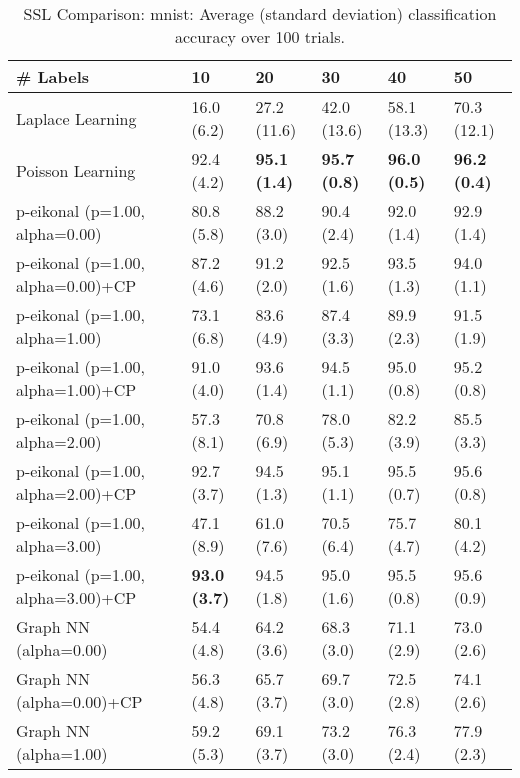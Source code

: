 \documentclass{article}
\begin{document}
\begin{table*}[t!]
\vspace{-3mm}
\caption{SSL Comparison: mnist: Average (standard deviation) classification accuracy over 100 trials.}
\vspace{-3mm}
\label{tab:SSL Comparison: mnist}
\vskip 0.15in
\begin{center}
\begin{small}
\begin{sc}
\begin{tabular}{llllll}
\toprule
\# Labels&\textbf{10}&\textbf{20}&\textbf{30}&\textbf{40}&\textbf{50}\\
\midrule
Laplace Learning&16.0 (6.2)      &27.2 (11.6)      &42.0 (13.6)      &58.1 (13.3)      &70.3 (12.1)      \\
Poisson Learning&92.4 (4.2)      &{\bf 95.1 (1.4)}&{\bf 95.7 (0.8)}&{\bf 96.0 (0.5)}&{\bf 96.2 (0.4)}\\
p-eikonal (p=1.00, alpha=0.00)&80.8 (5.8)      &88.2 (3.0)      &90.4 (2.4)      &92.0 (1.4)      &92.9 (1.4)      \\
p-eikonal (p=1.00, alpha=0.00)+CP&87.2 (4.6)      &91.2 (2.0)      &92.5 (1.6)      &93.5 (1.3)      &94.0 (1.1)      \\
p-eikonal (p=1.00, alpha=1.00)&73.1 (6.8)      &83.6 (4.9)      &87.4 (3.3)      &89.9 (2.3)      &91.5 (1.9)      \\
p-eikonal (p=1.00, alpha=1.00)+CP&91.0 (4.0)      &93.6 (1.4)      &94.5 (1.1)      &95.0 (0.8)      &95.2 (0.8)      \\
p-eikonal (p=1.00, alpha=2.00)&57.3 (8.1)      &70.8 (6.9)      &78.0 (5.3)      &82.2 (3.9)      &85.5 (3.3)      \\
p-eikonal (p=1.00, alpha=2.00)+CP&92.7 (3.7)      &94.5 (1.3)      &95.1 (1.1)      &95.5 (0.7)      &95.6 (0.8)      \\
p-eikonal (p=1.00, alpha=3.00)&47.1 (8.9)      &61.0 (7.6)      &70.5 (6.4)      &75.7 (4.7)      &80.1 (4.2)      \\
p-eikonal (p=1.00, alpha=3.00)+CP&{\bf 93.0 (3.7)}&94.5 (1.8)      &95.0 (1.6)      &95.5 (0.8)      &95.6 (0.9)      \\
Graph NN (alpha=0.00)&54.4 (4.8)      &64.2 (3.6)      &68.3 (3.0)      &71.1 (2.9)      &73.0 (2.6)      \\
Graph NN (alpha=0.00)+CP&56.3 (4.8)      &65.7 (3.7)      &69.7 (3.0)      &72.5 (2.8)      &74.1 (2.6)      \\
Graph NN (alpha=1.00)&59.2 (5.3)      &69.1 (3.7)      &73.2 (3.0)      &76.3 (2.4)      &77.9 (2.3)      \\

\end{tabular}
\end{sc}
\end{small}
\end{center}
\end{table*}
\end{document}
